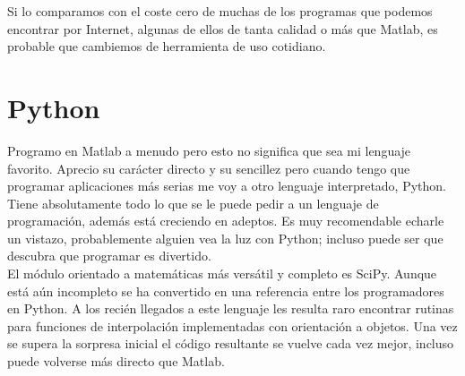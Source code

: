 Si lo comparamos con el coste cero de muchas de los programas que
podemos encontrar por Internet, algunas de ellos de tanta calidad
o más que Matlab, es probable que cambiemos de herramienta de uso
cotidiano.


\section{Python}

Programo en Matlab a menudo pero esto no significa que sea mi lenguaje
favorito. Aprecio su carácter directo y su sencillez pero cuando tengo
que programar aplicaciones más serias me voy a otro lenguaje interpretado,
Python. Tiene absolutamente todo lo que se le puede pedir a un lenguaje
de programación, además está creciendo en adeptos. Es muy recomendable
echarle un vistazo, probablemente alguien vea la luz con Python; incluso
puede ser que descubra que programar es divertido.\\

El módulo orientado a matemáticas más versátil y completo es SciPy.
Aunque está aún incompleto se ha convertido en una referencia entre
los programadores en Python. A los recién llegados a este lenguaje
les resulta raro encontrar rutinas para funciones de interpolación
implementadas con orientación a objetos. Una vez se supera la sorpresa
inicial el código resultante se vuelve cada vez mejor, incluso puede
volverse más directo que Matlab.
